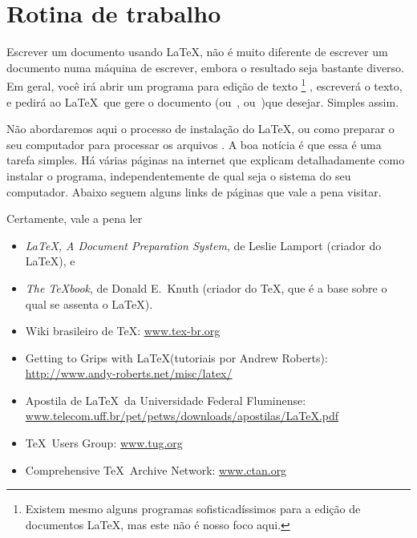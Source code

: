 \section{Rotina de trabalho}

Escrever um documento usando \LaTeX, não é muito diferente de escrever
um documento numa máquina de escrever, embora o resultado seja
bastante diverso. Em geral, você irá abrir um programa para edição
de texto%
\footnote{%
  Existem mesmo alguns programas sofisticadíssimos
  para a edição de documentos \LaTeX, mas este não é nosso foco
  aqui.}%
, escreverá o texto, e pedirá ao \LaTeX\ que gere o
documento  (ou~, ou~)que
desejar. Simples assim.

Não abordaremos aqui o processo de instalação do \LaTeX, ou como
preparar o seu computador para processar os arquivos . A
boa notícia é que essa é uma tarefa simples. Há várias páginas na
internet que explicam detalhadamente como instalar o programa,
independentemente de qual seja o sistema do seu computador. Abaixo seguem
alguns links de páginas que vale a pena visitar.

Certamente, vale a pena ler 
\begin{itemize}
\item \emph{\LaTeX, A Document Preparation System}, de Leslie Lamport
  (criador do \LaTeX),
  e
\item \emph{The \TeX book}, de Donald E.~Knuth (criador do \TeX, que é
  a base sobre o qual se assenta o \LaTeX).
\item Wiki brasileiro de \TeX: \url{www.tex-br.org}
\item Getting to Grips with \LaTeX (tutoriais por Andrew Roberts): \url{http://www.andy-roberts.net/misc/latex/}
\item Apostila de \LaTeX\ da Universidade Federal Fluminense: \url{www.telecom.uff.br/pet/petws/downloads/apostilas/LaTeX.pdf}
\item \TeX\ Users Group: \url{www.tug.org}
\item Comprehensive \TeX\ Archive Network: \url{www.ctan.org}
\end{itemize}
